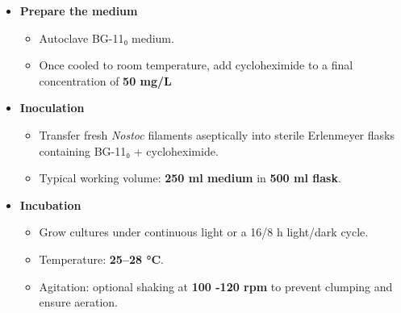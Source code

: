 \documentclass[
  11pt,
]{article}
\providecommand{\tightlist}{%
  \setlength{\itemsep}{0pt}\setlength{\parskip}{0pt}}
\begin{document}
\begin{itemize}
\tightlist
\item
  \textbf{Prepare the medium}

  \begin{itemize}
  \tightlist
  \item
    Autoclave BG-11₀ medium.\\
  \item
    Once cooled to room temperature, add cycloheximide to a final
    concentration of \textbf{50 mg/L}\\
  \end{itemize}
\item
  \textbf{Inoculation}

  \begin{itemize}
  \tightlist
  \item
    Transfer fresh \emph{Nostoc} filaments aseptically into sterile
    Erlenmeyer flasks containing BG-11₀ + cycloheximide.\\
  \item
    Typical working volume: \textbf{250 ml medium} in \textbf{500 ml
    flask}.\\
  \end{itemize}
\item
  \textbf{Incubation}

  \begin{itemize}
  \tightlist
  \item
    Grow cultures under continuous light or a 16/8 h light/dark cycle.\\
  \item
    Temperature: \textbf{25--28 °C}.\\
  \item
    Agitation: optional shaking at \textbf{100 -120 rpm} to prevent
    clumping and ensure aeration.
  \end{itemize}
\end{itemize}
\end{document}
